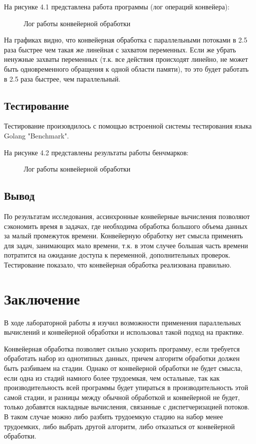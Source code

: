 \documentclass[12pt]{report}
\begin{document}
На рисунке 4.1 представлена работа программы (лог операций конвейера):
\begin{figure}[h]
	\caption{Лог работы конвейерной обработки}
	\label{fig:v_st}
\end{figure}
\begin{center}

\end{center}


На графиках видно, что конвейерная обработка с параллельными потоками в 2.5 раза быстрее чем такая же линейная с захватом переменных.
Если же убрать ненужные захваты переменных (т.к. все действия происходят линейно, не может быть одновременного обращения к одной области памяти), то это будет работать в 2.5 раза быстрее, чем параллельный.

\section{Тестирование}
Тестирование произовдилось с помощью встроенной системы тестирования языка Golang "Benchmark".


На рисунке 4.2 представлены результаты работы бенчмарков:
\begin{figure}[h]
	\caption{Лог работы конвейерной обработки}
	\label{fig:v_st}
\end{figure}




\section{Вывод}
По результатам исследования, ассинхронные конвейерные вычисления позволяют сэкономить время в задачах, где необходима обработка большого объема данных за малый промежуток времени. Конвейерную обработку нет смысла применять для задач, занимающих мало времени, т.к. в этом случее большая часть времени
потратится на ожидание доступа к переменной, дополнительных проверок.
Тестирование показало, что конвейерная обработка реализована правильно.

\chapter*{Заключение}
В ходе лабораторной работы я изучил возможности применения параллельных вычислений и конвейерной обработки и использовал такой подход на практике. 

Конвейерная обработка позволяет сильно ускорить программу, если требуется обработать набор из однотипных данных, причем алгоритм обработки должен быть разбиваем на стадии. Однако от конвейерной обработки не будет смысла, если одна из стадий намного более трудоемкая, чем остальные, так как производительность всей программы будет упираться в производительность этой самой стадии, и разницы между обычной обработкой и конвейерной не будет, только добавятся накладные вычисления, связанные с диспетчеризацией потоков. В таком случае можно либо разбить трудоемкую стадию на набор менее трудоемких, либо выбрать другой алгоритм, либо отказаться от конвейерной обработки.
\end{document}

